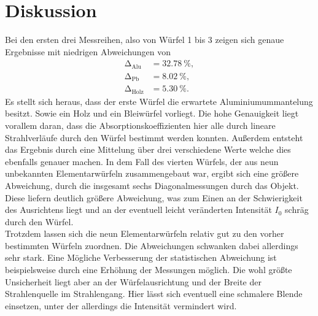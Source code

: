 \section{Diskussion}

Bei den ersten drei Messreihen, also von Würfel 1 bis 3 zeigen sich genaue Ergebnisse mit niedrigen Abweichungen von 
\begin{align*}
\increment_{\text{Alu}} &= \SI{32.78}{\percent}, \\
\increment_{\text{Pb}} &= \SI{8.02}{\percent}, \\
\increment_{\text{Holz}} &= \SI{5.30}{\percent}.
\end{align*}
Es stellt sich heraus, dass der erste Würfel die erwartete Aluminiumummantelung besitzt. Sowie ein Holz und ein Bleiwürfel vorliegt.
Die hohe Genauigkeit liegt vorallem daran, dass die Absorptionskoeffizienten hier alle durch lineare Strahlverläufe durch den Würfel bestimmt werden konnten. Außerdem entsteht das Ergebnis durch eine Mittelung über drei verschiedene Werte welche 
dies ebenfalls genauer machen. In dem Fall des vierten Würfels, der aus neun unbekannten Elementarwürfeln zusammengebaut war, ergibt sich eine größere Abweichung, durch die insgesamt sechs Diagonalmessungen durch das Objekt. Diese liefern
deutlich größere Abweichung, was zum Einen an der Schwierigkeit des Ausrichtens liegt und an der eventuell leicht veränderten Intensität $I_0$ schräg durch den Würfel.
\\
\newline
Trotzdem lassen sich die neun Elementarwürfeln relativ gut zu den vorher bestimmten Würfeln zuordnen. Die Abweichungen schwanken dabei allerdings sehr stark. Eine Mögliche Verbesserung der statistischen Abweichung ist beispielsweise durch 
eine Erhöhung der Messungen möglich. Die wohl größte Unsicherheit liegt aber an der Würfelausrichtung und der Breite der Strahlenquelle im Strahlengang. Hier lässt sich eventuell eine schmalere Blende einsetzen, unter der allerdings die Intensität
vermindert wird.